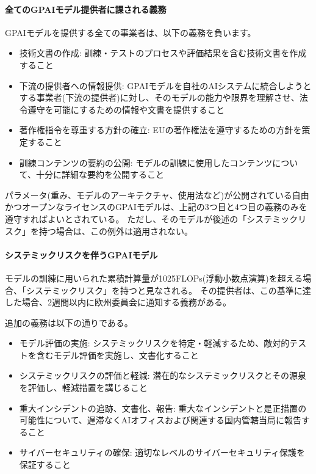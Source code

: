 \paragraph{全てのGPAIモデル提供者に課される義務}
GPAIモデルを提供する全ての事業者は、以下の義務を負います。

\begin{itemize}
    \item 技術文書の作成: 訓練・テストのプロセスや評価結果を含む技術文書を作成すること
    \item 下流の提供者への情報提供: GPAIモデルを自社のAIシステムに統合しようとする事業者(下流の提供者)に対し、そのモデルの能力や限界を理解させ、法令遵守を可能にするための情報や文書を提供すること
    \item 著作権指令を尊重する方針の確立: EUの著作権法を遵守するための方針を策定すること
    \item 訓練コンテンツの要約の公開: モデルの訓練に使用したコンテンツについて、十分に詳細な要約を公開すること
\end{itemize}

パラメータ(重み、モデルのアーキテクチャ、使用法など)が公開されている自由かつオープンなライセンスのGPAIモデルは、上記の3つ目と4つ目の義務のみを遵守すればよいとされている。
ただし、そのモデルが後述の「システミックリスク」を持つ場合は、この例外は適用されない。

\paragraph{システミックリスクを伴うGPAIモデル}
モデルの訓練に用いられた累積計算量が1025FLOPs(浮動小数点演算)を超える場合、「システミックリスク」を持つと見なされる。
その提供者は、この基準に達した場合、2週間以内に欧州委員会に通知する義務がある。

追加の義務は以下の通りである。

\begin{itemize}
    \item モデル評価の実施: システミックリスクを特定・軽減するため、敵対的テストを含むモデル評価を実施し、文書化すること
    \item システミックリスクの評価と軽減: 潜在的なシステミックリスクとその源泉を評価し、軽減措置を講じること
    \item 重大インシデントの追跡、文書化、報告: 重大なインシデントと是正措置の可能性について、遅滞なくAIオフィスおよび関連する国内管轄当局に報告すること
    \item サイバーセキュリティの確保: 適切なレベルのサイバーセキュリティ保護を保証すること
\end{itemize}


